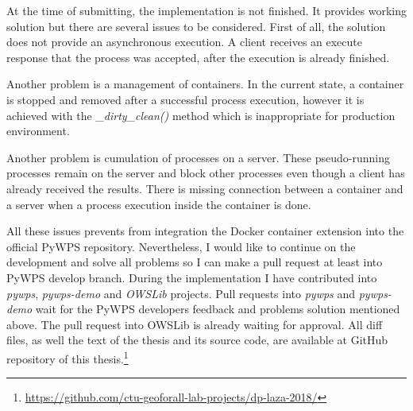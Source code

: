 \newpage
At the time of submitting, the implementation is not finished. It
provides working solution but there are several issues to be
considered. First of all, the solution does not provide an
asynchronous execution. A client receives an execute response that the
process was accepted, after the execution is already finished.

Another problem is a management of containers. In the current state, a
container is stopped and removed after a successful process execution,
however it is achieved with the \textit{\_dirty\_clean()} method which
is inappropriate for production environment.

Another problem is cumulation of processes on a server. These
pseudo-running processes remain on the server and block other
processes even though a client has already received the results. There
is missing connection between a container and a server when a process
execution inside the container is done.

All these issues prevents from integration the Docker container
extension into the official PyWPS repository.  Nevertheless, I would
like to continue on the development and solve all problems so I can
make a pull request at least into PyWPS develop branch. During the
implementation I have contributed into \textit{pywps}, \textit{pywps-demo}
and \textit{OWSLib} projects. Pull requests
into \textit{pywps} and \textit{pywps-demo} wait for the PyWPS
developers feedback and problems solution mentioned above. The pull
request into OWSLib is already waiting for approval. All diff files,
as well the text of the thesis and its source code,
are available at GitHub repository of this 
thesis.\footnote{\url{https://github.com/ctu-geoforall-lab-projects/dp-laza-2018/}}
